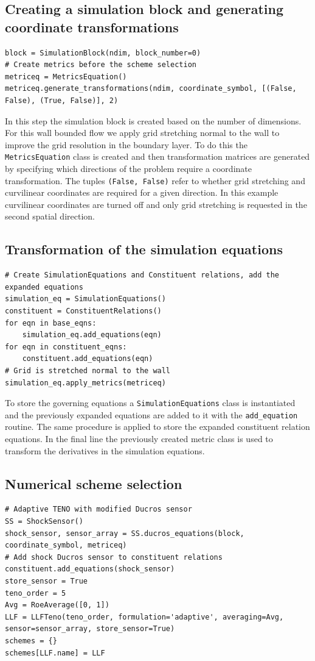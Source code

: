 \documentclass[11pt]{article}
\begin{document}
\subsection{Creating a simulation block and generating coordinate transformations}\label{sec:applying_transformation}
\begin{lstlisting}
block = SimulationBlock(ndim, block_number=0)
# Create metrics before the scheme selection
metriceq = MetricsEquation()
metriceq.generate_transformations(ndim, coordinate_symbol, [(False, False), (True, False)], 2)
\end{lstlisting}
In this step the simulation block is created based on the number of dimensions. For this wall bounded flow we apply grid stretching normal to the wall to improve the grid resolution in the boundary layer. To do this the \verb|MetricsEquation| class is created and then transformation matrices are generated by specifying which directions of the problem require a coordinate transformation. The tuples \verb|(False, False)| refer to whether grid stretching and curvilinear coordinates are required for a given direction. In this example curvilinear coordinates are turned off and only grid stretching is requested in the second spatial direction.

\subsection{Transformation of the simulation equations}
\begin{lstlisting}
# Create SimulationEquations and Constituent relations, add the expanded equations
simulation_eq = SimulationEquations()
constituent = ConstituentRelations()
for eqn in base_eqns:
    simulation_eq.add_equations(eqn)
for eqn in constituent_eqns:
    constituent.add_equations(eqn)
# Grid is stretched normal to the wall
simulation_eq.apply_metrics(metriceq)
\end{lstlisting}
To store the governing equations a \verb|SimulationEquations| class is instantiated and the previously expanded equations are added to it with the \verb|add_equation| routine. The same procedure is applied to store the expanded constituent relation equations. In the final line the previously created metric class is used to transform the derivatives in the simulation equations.

\subsection{Numerical scheme selection}
\begin{lstlisting}
# Adaptive TENO with modified Ducros sensor
SS = ShockSensor()
shock_sensor, sensor_array = SS.ducros_equations(block, coordinate_symbol, metriceq)
# Add shock Ducros sensor to constituent relations
constituent.add_equations(shock_sensor)
store_sensor = True
teno_order = 5
Avg = RoeAverage([0, 1])
LLF = LLFTeno(teno_order, formulation='adaptive', averaging=Avg, sensor=sensor_array, store_sensor=True)
schemes = {}
schemes[LLF.name] = LLF
\end{lstlisting}
\end{document}
